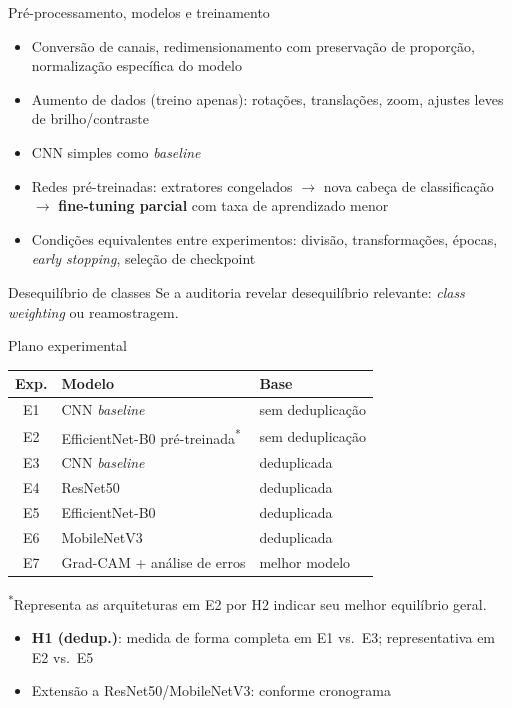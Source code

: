 \documentclass[aspectratio=169]{beamer}
\begin{document}
\begin{frame}{Pré-processamento, modelos e treinamento}
  \begin{itemize}
    \item Conversão de canais, redimensionamento com preservação de proporção, normalização específica do modelo
    \item Aumento de dados (treino apenas): rotações, translações, zoom, ajustes leves de brilho/contraste
    \item CNN simples como \textit{baseline}
    \item Redes pré-treinadas: extratores congelados \(\to\) nova cabeça de classificação \(\to\) \textbf{fine-tuning parcial} com taxa de aprendizado menor
    \item Condições equivalentes entre experimentos: divisão, transformações, épocas, \textit{early stopping}, seleção de checkpoint
  \end{itemize}
  \begin{block}{Desequilíbrio de classes}
    Se a auditoria revelar desequilíbrio relevante: \textit{class weighting} ou reamostragem.
  \end{block}
\end{frame}

\begin{frame}{Plano experimental}
  \begin{table}
    \centering
    \small
    \begin{tabular}{@{}cll@{}}
      \toprule
      \textbf{Exp.} & \textbf{Modelo} & \textbf{Base} \\
      \midrule
      E1 & CNN \textit{baseline} & sem deduplicação \\
      E2 & EfficientNet-B0 pré-treinada\textsuperscript{*} & sem deduplicação \\
      E3 & CNN \textit{baseline} & deduplicada \\
      E4 & ResNet50 & deduplicada \\
      E5 & EfficientNet-B0 & deduplicada \\
      E6 & MobileNetV3 & deduplicada \\
      E7 & Grad-CAM + análise de erros & melhor modelo \\
      \bottomrule
    \end{tabular}
  \end{table}
  {\footnotesize \textsuperscript{*}Representa as arquiteturas em E2 por H2 indicar seu melhor equilíbrio geral.}
  \vspace{6pt}
  \begin{itemize}
    \item \textbf{H1 (dedup.)}: medida de forma completa em E1 vs.\ E3; representativa em E2 vs.\ E5
    \item Extensão a ResNet50/MobileNetV3: conforme cronograma
  \end{itemize}
\end{frame}
\end{document}
